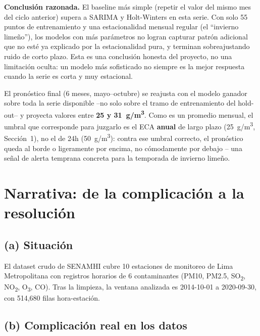 \documentclass[11pt,a4paper]{article}
\begin{document}
\textbf{Conclusión razonada.} El baseline más simple (repetir el valor del mismo mes
del ciclo anterior) supera a SARIMA y Holt-Winters en esta serie. Con solo 55 puntos de
entrenamiento y una estacionalidad mensual regular (el ``invierno limeño''), los
modelos con más parámetros no logran capturar patrón adicional que no esté ya explicado
por la estacionalidad pura, y terminan sobreajustando ruido de corto plazo. Esta es una
conclusión honesta del proyecto, no una limitación oculta: un modelo más sofisticado no
siempre es la mejor respuesta cuando la serie es corta y muy estacional.

El pronóstico final (6 meses, mayo--octubre) se reajusta con el modelo ganador sobre
toda la serie disponible --no solo sobre el tramo de entrenamiento del hold-out-- y
proyecta valores entre \textbf{25 y 31~\textmu g/m\textsuperscript{3}}. Como es un
promedio mensual, el umbral que corresponde para juzgarlo es el ECA \textbf{anual} de
largo plazo (25~\textmu g/m\textsuperscript{3}, Sección~1), no el de 24h
(50~\textmu g/m\textsuperscript{3}): contra ese umbral correcto, el pronóstico queda al
borde o ligeramente por encima, no cómodamente por debajo -- una señal de alerta
temprana concreta para la temporada de invierno limeño.

\section{Narrativa: de la complicación a la resolución}

\subsection*{(a) Situación}

El dataset crudo de SENAMHI cubre 10 estaciones de monitoreo de Lima Metropolitana con
registros horarios de 6 contaminantes (PM10, PM2.5, SO\textsubscript{2},
NO\textsubscript{2}, O\textsubscript{3}, CO). Tras la limpieza, la ventana analizada es
2014-10-01 a 2020-09-30, con 514{,}680 filas hora-estación.

\subsection*{(b) Complicación real en los datos}
\end{document}
